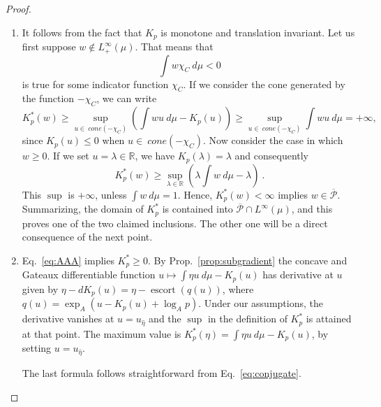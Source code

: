 \documentclass[graybox]{svmult}
\newcommand{\escortof}[1]{\operatorname{escort}\left(#1\right)}
\newcommand{\reals}{\mathbb{R}}
\begin{document}
\begin{proof}
\begin{enumerate} 
\item It follows from the fact that $K_{p}$ is monotone and translation invariant. Let us first suppose $w\notin L^{\infty }_+(\mu )$. That means that
  \begin{equation*}
 \int w \chi_C  \ d\mu < 0    
\end{equation*}
is true for some indicator function $\chi_C$. If we consider the cone generated by the function $-\chi_C$, we can write
\begin{equation*}
K_{p}^{\ast }\left( w\right) \geq \sup_{u\in\ cone(-\chi_C)}\left(\int wu\ d\mu -K_{p}\left(
u\right)\right) \geq \sup_{u\in\ cone(-\chi_C)}\int wu\ d\mu = +\infty,
\end{equation*}
since $K_{p}\left( u\right) \leq 0$ when $u\in\ cone(-\chi_C)$. Now consider the case in which $w \geq 0$. If we set $u = \lambda \in \reals$, we have $K_p(\lambda) = \lambda$ and consequently 
\begin{equation}\label{eq:AAA}
K_p^*(w) \geq \sup_{\lambda \in \reals}\left( \lambda \int w\ d\mu
-\lambda \right) \ .
\end{equation}
This $\sup$ is $+\infty$, unless $\int w \ d\mu = 1$.
Hence, $K_{p}^{\ast }\left( w\right) <\infty $ implies $w\in \overline{\mathcal{P}}$. Summarizing, the domain of $K_{p}^{\ast }$ is contained into $\overline{\mathcal P}\cap L^{\infty}(\mu)$, and this proves one of the two claimed inclusions. The other one will be a direct consequence of the next point.

\item Eq.~\eqref{eq:AAA} implies $K_{p}^{\ast }\geq 0$.  By Prop.~\ref{prop:subgradient} the concave and Gateaux differentiable function $u \mapsto \int \eta u \ d\mu - K_p(u)$ has derivative at $u$ given by $\eta - dK_p(u) = \eta - \escortof{q(u)}$, where $q(u) = \exp_A(u - K_p(u) + \log_Ap)$. Under our assumptions, the derivative vanishes at $u=u_{\hat \eta}$ and the $\sup$ in the definition of $K_p^*$ is attained at that point. The maximum value is $K_p^*(\eta) = \int \eta u \ d\mu - K_p(u)$, by setting $u=u_{\hat \eta}$.

The last formula follows straightforward from Eq.~\eqref{eq:conjugate}.


\end{enumerate}
\end{proof}
\end{document}
